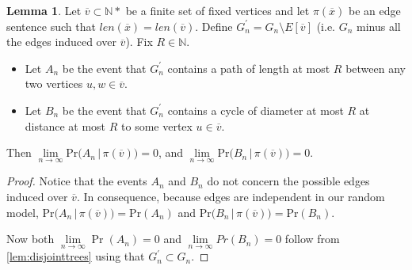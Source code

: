 \documentclass[12pt,notitlepage,a4paper]{article}
\theoremstyle{definition}
\newtheorem{lemma}{Lemma}[section]
\newcommand{\N}{\mathbb{N}}
\newcommand{\Ln}{\lim\limits_{n\to \infty}}
\begin{document}
\begin{lemma}\label{lem:far_away}
	Let $\overline{v} \subset \N*$ be a finite set of fixed vertices and let 
	$\pi(\overline{x})$ be an edge sentence such that
	$len(\overline{x})=len(\overline{v})$. 
	Define $G_n^\prime=G_n \setminus E[\overline{v}]$ (i.e. $G_n$ minus all the
	edges induced over $\overline{v}$). Fix $R\in \N$. 
	\begin{itemize}
		\item Let $A_n$ be the event that $G^\prime_n$ contains a path of 
		length	at most	$R$ between any two vertices $u,w\in \overline{v}$.
		\item Let $B_n$ be the event
		that $G^\prime_n$ contains a cycle of diameter at most $R$
		at distance at most $R$ to some vertex $u\in \overline{v}$.
	\end{itemize}
	Then $\Ln \mathrm{Pr}\big(A_n \, | \, \pi(\overline{v})\big)=0$, and 
	$\Ln \mathrm{Pr}\big(B_n \, | \, \pi(\overline{v})\big)=0$. 
\end{lemma}
\begin{proof}
	Notice that the events $A_n$ and $B_n$ do not concern the possible edges
	induced over $\overline{v}$. In consequence, because edges are independent
	in our random model, 
	$\mathrm{Pr}\big(A_n \, | \, \pi(\overline{v})\big)
	=\mathrm{Pr}(A_n)$ and 
	$\mathrm{Pr}\big(B_n \, | \, \pi(\overline{v})\big)
	=\mathrm{Pr}(B_n)$.\par
	Now both $\Ln \Pr(A_n)=0$ and $\Ln Pr(B_n)=0$ follow from 
	\cref{lem:disjointtrees} using that $G^\prime_n\subset G_n$.  
\end{proof}
\end{document}

